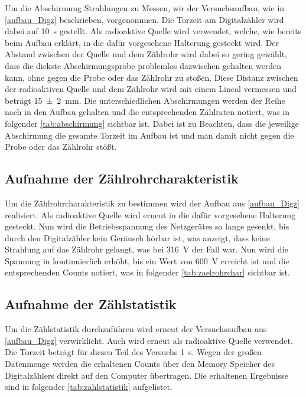 \documentclass[12pt,english,ngerman]{scrartcl}
\begin{document}
Um die Abschirmung Strahlungen zu Messen, wir der Versuchsaufbau, wie in \autoref{aufbau_Digz} beschrieben, vorgenommen. 
Die Torzeit am Digitalzähler wird dabei auf \SI{10}{\second} gestellt. Als radioaktive Quelle wird  verwendet, welche, wie 
bereits beim Aufbau erklärt, in die dafür vorgesehene Halterung gesteckt wird. Der Abstand zwischen der Quelle und dem Zählrohr
wird dabei so gering gewählt, dass die dickste Abschirmungsprobe problemlos dazwischen gehalten werden kann, ohne gegen
die Probe oder das Zählrohr zu stoßen. Diese Distanz zwischen der radioaktiven Quelle und dem Zählrohr wird mit einem Lineal
vermessen und beträgt \SI{15(2)}{\mm}. Die unterschiedlichen Abschirmungen werden der Reihe nach in den Aufbau gehalten und die 
entsprechenden Zählraten notiert, was in folgender \autoref{tab:abschirmung} sichtbar ist. Dabei ist zu Beachten, dass die 
jeweilige Abschirmung die gesamte Torzeit im Aufbau ist und man damit nicht gegen die Probe oder das Zählrohr stößt.


\subsection{Aufnahme der Zählrohrcharakteristik}

Um die Zählrohrcharakteristik zu bestimmen wird der Aufbau aus \autoref{aufbau_Digz} realisiert.
Als radioaktive Quelle wird erneut  in die dafür vorgesehene Halterung gesteckt. Nun wird die Betriebsspannung des
Netzgerätes so lange gesenkt, bis durch den Digitalzähler kein Geräusch hörbar ist, was anzeigt, dass keine Strahlung auf das 
Zählrohr gelangt, was bei \SI{316}{\volt} der Fall war. Nun wird die Spannung in kontinuierlich erhöht, bis ein Wert von 
\SI{600}{\volt} erreicht ist und die entsprechenden Counts
notiert, was in folgender \autoref{tab:zaelrohrchar} sichtbar ist.



\subsection{Aufnahme der Zählstatistik}

Um die Zählstatistik durchzuführen wird erneut der Versuchsaufbau aus \autoref{aufbau_Digz} verwirklicht. Auch wird erneut
 als radioaktive Quelle verwendet.
Die Torzeit beträgt für diesen Teil des Versuchs \SI{1}{\second}. Wegen der großen Datenmenge werden die erhaltenen Counts über den
Memory Speicher des Digitalzählers direkt auf den Computer übertragen. Die erhaltenen Ergebnisse sind in folgender 
\autoref{tab:zahlstatistik} aufgelistet.
\end{document}
